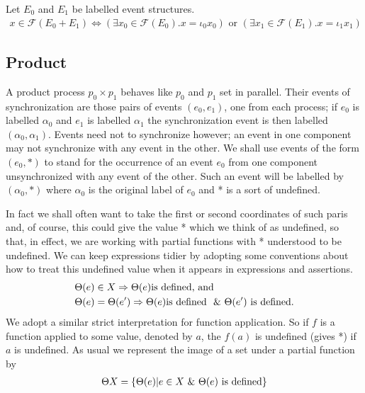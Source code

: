 \documentclass{article}
\begin{document}
\begin{proposition}

    Let $E_0$ and $E_1$ be labelled event structures.
    \begin{align*}
        x \in \mathcal{F}(E_0+E_1) \iff (\exists x_0 \in \mathcal{F}(E_0).x=\iota_0x_0)
        \text{ or } (\exists x_1 \in \mathcal{F}(E_1).x=\iota_1x_1)
    \end{align*}

\end{proposition}

\subsection{Product}

A product process $p_0 \times p_1$ behaves like $p_0$ and $p_1$ set in parallel.
Their events of synchronization are those pairs of events $(e_0,e_1)$, one from each process;
if $e_0$ is labelled $\alpha_0$ and $e_1$ is labelled $\alpha_1$ the synchronization event is
then labelled $(\alpha_0,\alpha_1)$.
Events need not to synchronize however; an event in one component may not synchronize with
any event in the other.
We shall use events of the form $(e_0,*)$ to stand for the occurrence of an event $e_0$
from one component unsynchronized with any event of the other.
Such an event will be labelled by $(\alpha_0,*)$ where $\alpha_0$ is the original label of $e_0$
and * is a sort of undefined.

In fact we shall often want to take the first or second coordinates of such paris and,
of course, this could give the value * which we think of as undefined,
so that, in effect, we are working with partial functions with * understood to be undefined.
We can keep expressions tidier by adopting some conventions about how to treat this undefined value
when it appears in expressions and assertions.
\begin{align*}
     & \Theta(e) \in X \Rightarrow \Theta(e) \text{is defined, and }                                      \\
     & \Theta(e) = \Theta(e') \Rightarrow \Theta(e) \text{is defined } \ \& \  \Theta(e')\text{ is defined}.
\end{align*}
We adopt a similar strict interpretation for function application.
So if $f$ is a function applied to some value, denoted by $a$, the $f(a)$ is undefined (gives *)
if $a$ is undefined.
As usual we represent the image of a set under a partial function by
\begin{align*}
    \Theta X = \{\Theta(e)|e \in X \ \& \  \Theta(e) \text{ is defined}\}
\end{align*}
\end{document}
